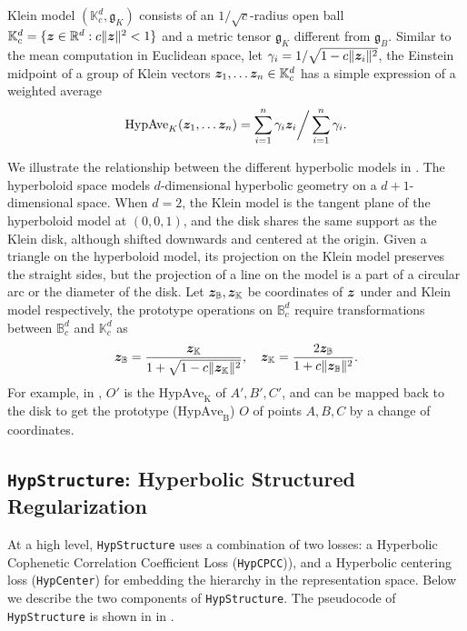 \begin{definition}
Klein model $(\mathbb{K}_c^d, \mathfrak{g}_K)$ consists of an $1/\sqrt{c}$-radius open ball $\mathbb{K}_c^d = \{{\bm{z}}\in{\mathbb{R}}^d:c\|{\bm{z}}\|^2 < 1\}$ and a metric tensor $\mathfrak{g}_K$ different from $\mathfrak{g}_B$. Similar to the mean computation in Euclidean space, let $\gamma_i = 1 / \sqrt{1 - c\|{\bm{z}}_i\|^2}$, the Einstein midpoint of a group of Klein vectors ${\bm{z}}_1, \dots {\bm{z}}_n \in \mathbb{K}_c^d$ has a simple expression of a weighted average
\begin{equation}
    \text{HypAve}_K({\bm{z}}_1, \dots {\bm{z}}_n) = \sum\limits_{i=1}^n \gamma_i {\bm{z}}_i \bigg/ \sum\limits_{i=1}^n \gamma_i.
    \label{eq:hypave}
\end{equation}
\end{definition}
We illustrate the relationship between the different hyperbolic models in . The hyperboloid space models $d$-dimensional hyperbolic geometry on a $d+1$-dimensional space. When $d = 2$, the Klein model is the tangent plane of the hyperboloid model at $(0,0,1)$, and the \Poincare disk shares the same support as the Klein disk, although shifted downwards and centered at the origin. Given a triangle on the hyperboloid model, its projection on the Klein model preserves the straight sides, but the projection of a line on the \Poincare model is a part of a circular arc or the diameter of the disk. Let ${\bm{z}}_\mathbb{B}, {\bm{z}}_\mathbb{K}$ be coordinates of ${\bm{z}}$ under \Poincare and Klein model respectively, the prototype operations on $\mathbb{B}^d_c$ require transformations between $\mathbb{B}^d_c$ and $\mathbb{K}^d_c$ as
\begin{equation}
    {\bm{z}}_\mathbb{B} = \frac{{\bm{z}}_\mathbb{K}}{1 + \sqrt{1 - c\|{\bm{z}}_\mathbb{K}\|^2}}, \quad {\bm{z}}_\mathbb{K} = \frac{2{\bm{z}}_\mathbb{B}}{1 + c\|{\bm{z}}_\mathbb{B}\|^2}.
    \label{eq:Poincare2Klein}
\end{equation}
For example, in , $O'$ is the $\text{HypAve}_\text{K}$ of $A',B',C'$, and can be mapped back to the \Poincare disk to get the \Poincare prototype ($\text{HypAve}_\text{B}$) $O$ of points $A, B, C$ by a change of coordinates.

\subsection{\texttt{HypStructure}: Hyperbolic Structured Regularization}
\label{sec:hypstructure-method}
At a high level, \texttt{HypStructure} uses a combination of two losses: a Hyperbolic Cophenetic Correlation Coefficient Loss (\texttt{HypCPCC})), and a Hyperbolic centering loss (\texttt{HypCenter}) for embedding the hierarchy in the representation space. Below we describe the two components of \texttt{HypStructure}. The pseudocode of \texttt{HypStructure} is shown in  in .


